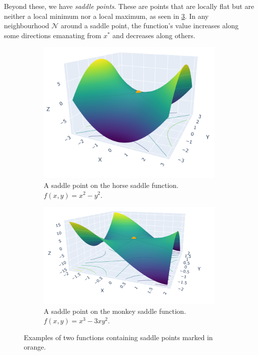 Beyond these, we have \textit{saddle points}. These are points that are locally flat but are neither a local minimum nor a local maximum, as seen in \cref{fig:saddle_point}. In any neighbourhood $\mathcal{N}$ around a saddle point, the function's value increases along some directions emanating from $x^*$ and decreases along others.

\begin{figure}[h]
    \begin{subfigure}[b]{0.48\linewidth}
        \centering
        \includegraphics[width=0.8\linewidth]{figures/2background/horse_saddle.png}
        \caption{A saddle point on the horse saddle function. \\
        $f(x,y) = x^2 - y^2$.}
        \label{fig:horse_saddle}
    \end{subfigure}
    \hfill
    \begin{subfigure}[b]{0.48\linewidth}
        \centering
        \includegraphics[width=\linewidth]{figures/2background/monkey_saddle.png}
        \caption{A saddle point on the monkey saddle function. \\
        $f(x,y) = x^3 - 3xy^2$.}
        \label{fig:monkey_saddle}
    \end{subfigure}
    \caption{Examples of two functions containing saddle points marked in orange.}
    \label{fig:saddle_point}
\end{figure}

